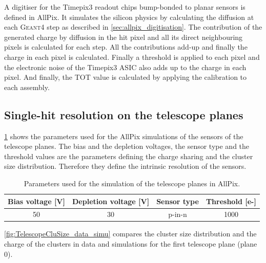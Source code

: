A digitiser for the Timepix3 readout chips bump-bonded to planar
sensors is defined in AllPix. It simulates the silicon physics by
calculating the diffusion at each \textsc{Geant4} step as described in
\cref{sec:allpix_digitisation}. The contribution of the generated
charge by diffusion in the hit pixel and all its direct neighbouring
pixels is calculated for each step. All the contributions add-up and
finally the charge in each pixel is calculated. Finally a threshold is
applied to each pixel and the electronic noise of the Timepix3 ASIC
also adds up to the charge in each pixel. And finally, the TOT value
is calculated by applying the calibration to each assembly.

\subsection{Single-hit resolution on the telescope planes}

\cref{tab:AllPixTelescopePlanesParams} shows the parameters used for
the AllPix simulations of the sensors of the telescope planes. The
bias and the depletion voltages, the sensor type and the threshold
values are the parameters defining the charge sharing and the cluster
size distribution. Therefore they define the intrinsic resolution of
the sensors.

\begin{table}[htbp]
  \centering
  \caption{Parameters used for the simulation of the telescope planes in AllPix.}
  \label{tab:AllPixTelescopePlanesParams}
  \begin{tabular}{cccc}
    \toprule
    Bias voltage [V] & Depletion voltage [V] & Sensor type & Threshold [e-] \\
    \midrule
    50 & 30 & p-in-n & 1000 \\
    \bottomrule
  \end{tabular}
\end{table}


\cref{fig:TelescopeCluSize_data_simu} compares the cluster size
distribution and the charge of the clusters in data and simulations
for the first telescope plane (plane 0).

